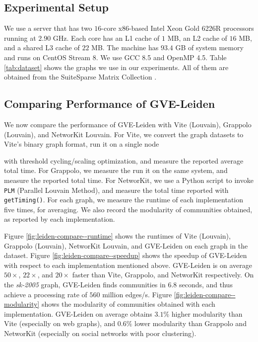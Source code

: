 \subsection{Experimental Setup}
\label{sec:setup}

We use a server that has two $16$-core x86-based Intel Xeon Gold 6226R processors running at $2.90$ GHz. Each core has an L1 cache of $1$ MB, an L2 cache of $16$ MB, and a shared L3 cache of $22$ MB. The machine has $93.4$ GB of system memory and runs on CentOS Stream 8. We use GCC 8.5 and OpenMP 4.5. Table \ref{tab:dataset} shows the graphs we use in our experiments. All of them are obtained from the SuiteSparse Matrix Collection \cite{suite19}.







\subsection{Comparing Performance of GVE-Leiden}

We now compare the performance of GVE-Leiden with Vite (Louvain), Grappolo (Louvain), and NetworKit Louvain. For Vite, we convert the graph datasets to Vite's binary graph format, run it on a single node with threshold cycling/scaling optimization, and measure the reported average total time. For Grappolo, we measure the run it on the same system, and measure the reported total time. For NetworKit, we use a Python script to invoke \texttt{PLM} (Parallel Louvain Method), and measure the total time reported with \texttt{getTiming()}. For each graph, we measure the runtime of each implementation five times, for averaging. We also record the modularity of communities obtained, as reported by each implementation.

Figure \ref{fig:leiden-compare--runtime} shows the runtimes of Vite (Louvain), Grappolo (Louvain), NetworKit Louvain, and GVE-Leiden on each graph in the dataset. Figure \ref{fig:leiden-compare--speedup} shows the speedup of GVE-Leiden with respect to each implementation mentioned above. GVE-Leiden is on average $50\times$, $22\times$, and $20\times$ faster than Vite, Grappolo, and NetworKit respectively. On the \textit{sk-2005} graph, GVE-Leiden finds communities in $6.8$ seconds, and thus achieve a processing rate of $560$ million edges/s. Figure \ref{fig:leiden-compare--modularity} shows the modularity of communities obtained with each implementation. GVE-Leiden on average obtains $3.1\%$ higher modularity than Vite (especially on web graphs), and $0.6\%$ lower modularity than Grappolo and NetworKit (especially on social networks with poor clustering).

